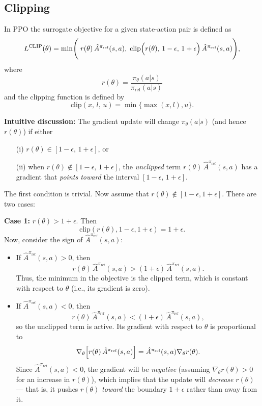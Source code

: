 \vspace{2mm}

\subsection{Clipping }

In PPO the surrogate objective for a given state-action pair is defined as
\[
  L^{\text{CLIP}}(\theta) = \min\Biggl( \; r(\theta)\,\hat{A}^{\pi_{\text{ref}}}(s,a), \;
  \text{clip}\Bigl( r(\theta),\, 1-\epsilon,\, 1+\epsilon \Bigr) \, \hat{A}^{\pi_{\text{ref}}}(s,a) \Biggr),
\]
where
\[
  r(\theta) = \frac{\pi_{\theta}(a|s)}{\pi_{\text{ref}}(a|s)}
\]
and the clipping function is defined by
\[
  \text{clip}(x,\, l,\, u) = \min\{\max(x,l),u\}.
\]

\textbf{Intuitive discussion:} The gradient update will change $\pi_{\theta}(a|s)$ (and hence $r(\theta)$) if either 
\begin{enumerate}
  \item[(i)] $r(\theta) \in [1-\epsilon,\,1+\epsilon]$, or 
  \item[(ii)] when $r(\theta) \notin [1-\epsilon,\,1+\epsilon]$, the \emph{unclipped} term $r(\theta)\,\hat{A}^{\pi_{\text{ref}}}(s,a)$ has a gradient that \emph{points toward} the interval $[1-\epsilon,\,1+\epsilon]$.
\end{enumerate}
The first condition is trivial. Now assume that $r(\theta)\notin[1-\epsilon,1+\epsilon]$. There are two cases:

\textbf{Case 1:} $r(\theta)>1+\epsilon$. Then
\[
  \text{clip}(r(\theta),1-\epsilon,1+\epsilon) = 1+\epsilon.
\]
Now, consider the sign of $\hat{A}^{\pi_{\text{ref}}}(s,a)$:
\begin{itemize}
  \item If $\hat{A}^{\pi_{\text{ref}}}(s,a)>0$, then 
  \[
    r(\theta)\,\hat{A}^{\pi_{\text{ref}}}(s,a) > (1+\epsilon)\,\hat{A}^{\pi_{\text{ref}}}(s,a).
  \]
  Thus, the minimum in the objective is the clipped term, which is constant with respect to $\theta$ (i.e., its gradient is zero).
  
  \item If $\hat{A}^{\pi_{\text{ref}}}(s,a)<0$, then 
  \[
    r(\theta)\,\hat{A}^{\pi_{\text{ref}}}(s,a) < (1+\epsilon)\,\hat{A}^{\pi_{\text{ref}}}(s,a),
  \]
  so the unclipped term is active. Its gradient with respect to $\theta$ is proportional to 
  \[
    \nabla_\theta \Bigl[ r(\theta)\,\hat{A}^{\pi_{\text{ref}}}(s,a) \Bigr] = \hat{A}^{\pi_{\text{ref}}}(s,a) \nabla_\theta r(\theta).
  \]
  Since $\hat{A}^{\pi_{\text{ref}}}(s,a) < 0$, the gradient will be \emph{negative} (assuming $\nabla_\theta r(\theta)>0$ for an increase in $r(\theta)$), which implies that the update will \emph{decrease} $r(\theta)$ --- that is, it pushes $r(\theta)$ \emph{toward} the boundary $1+\epsilon$ rather than away from it.
\end{itemize}

